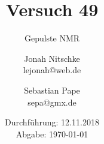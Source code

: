 

\title{Versuch 49}
\subtitle{Gepulste NMR}
\author{Jonah Nitschke\\
        lejonah@web.de \and
        Sebastian Pape\\
        sepa@gmx.de}
\date{Durchführung: 12.11.2018\\
      Abgabe: \today}



\maketitle
\newpage
\setcounter{page}{1}


\newpage

\newpage
\printbibliography


